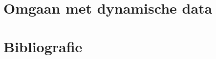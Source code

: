 \documentclass[fleqn,a4paper,12pt]{book}
\begin{document}
	\chapter{Omgaan met dynamische data}
	
	
	
	
	


	
	\chapter{Bibliografie}
	




\listoffigures
\end{document}
